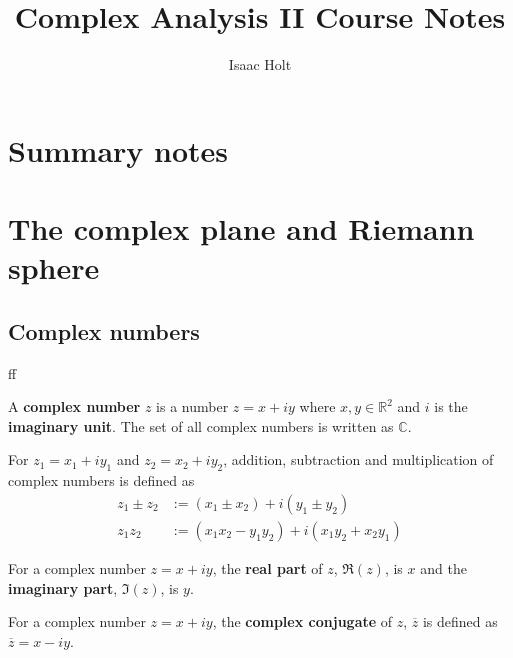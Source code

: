 

\title{Complex Analysis II Course Notes}
\author{Isaac Holt}





\newcommand{\Arg}{\text{Arg}}
\newcommand{\Log}{\text{Log}}
\newcommand{\biholo}{\mathrel{\overset{\sim}{\longrightarrow}}}
\newcommand{\Res}{\text{Res}}

\section{Summary notes}



\section{The complex plane and Riemann sphere}

\subsection{Complex numbers}
ff

\begin{definition}
	A \textbf{complex number} $z$ is a number $z = x + iy$ where $x, y \in \mathbb{R}^2$ and $i$ is the \textbf{imaginary unit}. The set of all complex numbers is written as $\mathbb{C}$.
\end{definition}

\begin{definition}
	For $z_1 = x_1 + i y_1$ and $z_2 = x_2 + i y_2$, addition, subtraction and multiplication of complex numbers is defined as
	\[
		\begin{aligned}
			z_1 \pm z_2 & := (x_1 \pm x_2) + i (y_1 \pm y_2) \\
			z_1 z_2 & := (x_1 x_2 - y_1 y_2) + i (x_1 y_2 + x_2 y_1)
		\end{aligned}
	\]
\end{definition}

\begin{definition}
	For a complex number $z = x + iy$, the \textbf{real part} of $z$, $\Re(z)$, is $x$ and the \textbf{imaginary part}, $\Im(z)$, is $y$.
\end{definition}

\begin{definition}
	For a complex number $z = x + iy$, the \textbf{complex conjugate} of $z$, $\overline{z}$ is defined as $\overline{z} = x - iy$.
\end{definition}


